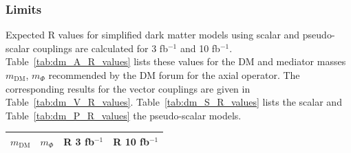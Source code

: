 \subsubsection{Limits}
Expected R values for simplified dark matter models using scalar and pseudo-scalar couplings are calculated for 3 fb$^{-1 }$ and 10 fb$^{-1 }$. Table~\ref{tab:dm_A_R_values} lists these
values for the DM and mediator masses $m_\textrm{DM}$, $m_\Phi$ recommended by the DM forum for the axial operator. The corresponding results for the vector couplings are given in Table~\ref{tab:dm_V_R_values}. Table~\ref{tab:dm_S_R_values} lists the scalar and Table~\ref{tab:dm_P_R_values} the pseudo-scalar models.



\begin{table}[h]
\centering
\begin{tabular}{llll}
\hline                      
 $m_\textrm{DM}$ & $m_\Phi$  & R 3 fb$^{-1}$ & R 10 fb$^{-1}$ \\ \hline


\end{tabular}
\end{table}

